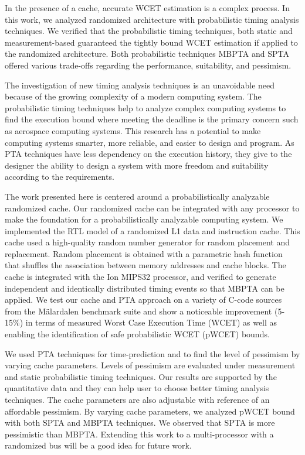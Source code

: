 In the presence of a cache, accurate WCET estimation is a complex process. In this work, we analyzed randomized architecture with probabilistic timing analysis techniques.  We verified that the probabilistic timing techniques, both static and measurement-based guaranteed the tightly bound WCET estimation if applied to the randomized  architecture.  Both probabilistic techniques MBPTA and SPTA  offered various trade-offs regarding the performance, suitability, and pessimism.

The investigation of new timing analysis techniques is an unavoidable need because of the growing complexity of a modern computing system. The probabilistic timing techniques help to analyze complex computing systems to find the execution bound where meeting the deadline is the primary concern such as aerospace computing systems. This research has a potential to make computing systems smarter, more reliable, and easier to design and program. As PTA techniques have less dependency on the execution history, they give to the designer the ability to design a system with more freedom and suitability according to the requirements.

The work presented here is centered around a probabilistically analyzable randomized cache. Our randomized cache can be integrated with any processor to make the foundation for a probabilistically analyzable computing system. We implemented the RTL model of a randomized L1 data and instruction cache. This cache used a high-quality random number generator for random placement and replacement.
Random placement is obtained with a parametric hash function that shuffles the association between memory addresses and cache blocks. The cache is integrated with the Ion MIPS32 processor, and verified to generate independent and identically distributed timing events so that MBPTA can be applied. We test our cache and PTA approach on a variety of C-code sources from the M\"alardalen benchmark suite and show a noticeable improvement (5-15\%) in terms of measured Worst Case Execution Time (WCET) as well as enabling the identification of safe probabilistic WCET (pWCET) bounds.

We  used PTA techniques for time-prediction and to find the level of pessimism by varying cache parameters. Levels of pessimism are evaluated under measurement and static probabilistic timing techniques. 
Our results are supported by the quantitative data and they can help user to choose better timing analysis techniques. The cache parameters are also adjustable  with reference of an affordable pessimism. By varying cache parameters, we analyzed pWCET bound with both SPTA and MBPTA techniques. We observed that SPTA is more pessimistic than MBPTA. Extending this work to a multi-processor with a randomized bus will be a good idea for future work.

